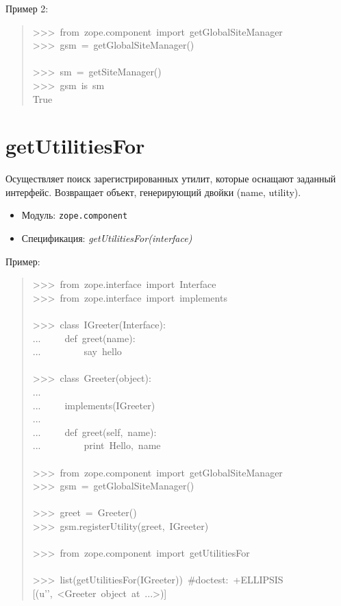 \documentclass[14pt,a4paper,openany,twoside,final]{extbook}
\providecommand*{\DUroletitlereference}[1]{\textsl{#1}}
\begin{document}
Пример 2:

\begin{quote}{\ttfamily \raggedright \noindent
>{}>{}>~from~zope.component~import~getGlobalSiteManager\\
>{}>{}>~gsm~=~getGlobalSiteManager()\\
~\\
>{}>{}>~sm~=~getSiteManager()\\
>{}>{}>~gsm~is~sm\\
True
}
\end{quote}


\section*{getUtilitiesFor%
  \label{getutilitiesfor}%
}

Осуществляет поиск зарегистрированных утилит, которые оснащают
заданный интерфейс.  Возвращает объект, генерирующий двойки (name, utility).

\begin{itemize}

\item Модуль: \texttt{zope.component}

\item Спецификация: \DUroletitlereference{getUtilitiesFor(interface)}

\end{itemize}

Пример:

\begin{quote}{\ttfamily \raggedright \noindent
>{}>{}>~from~zope.interface~import~Interface\\
>{}>{}>~from~zope.interface~import~implements\\
~\\
>{}>{}>~class~IGreeter(Interface):\\
...~~~~~def~greet(name):\\
...~~~~~~~~~\textquotedbl{}say~hello\textquotedbl{}\\
~\\
>{}>{}>~class~Greeter(object):\\
...\\
...~~~~~implements(IGreeter)\\
...\\
...~~~~~def~greet(self,~name):\\
...~~~~~~~~~print~\textquotedbl{}Hello\textquotedbl{},~name\\
~\\
>{}>{}>~from~zope.component~import~getGlobalSiteManager\\
>{}>{}>~gsm~=~getGlobalSiteManager()\\
~\\
>{}>{}>~greet~=~Greeter()\\
>{}>{}>~gsm.registerUtility(greet,~IGreeter)\\
~\\
>{}>{}>~from~zope.component~import~getUtilitiesFor\\
~\\
>{}>{}>~list(getUtilitiesFor(IGreeter))~\#doctest:~+ELLIPSIS\\
{[}(u'{}',~<Greeter~object~at~...>){]}
}
\end{quote}
\end{document}
